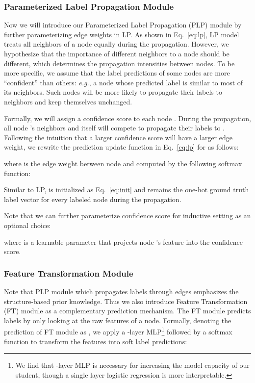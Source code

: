 \documentclass[sigconf]{acmart}
\begin{document}
\subsubsection{Parameterized Label Propagation Module}
Now we will introduce our Parameterized Label Propagation (PLP) module by further parameterizing edge weights in LP. As shown in Eq.~\ref{eq:lp}, LP model treats all neighbors of a node equally during the propagation. However, we hypothesize that the importance of different neighbors to a node should be different, which determines the propagation intensities between nodes. To be more specific, we assume that the label predictions of some nodes are more ``confident'' than others: \textit{e.g.}, a node whose predicted label is similar to most of its neighbors. Such nodes will be more likely to propagate their labels to neighbors and keep themselves unchanged.

Formally, we will assign a confidence score  to each node . During the propagation, all node 's neighbors and  itself will compete to propagate their labels to . Following the intuition that a larger confidence score will have a larger edge weight, we rewrite the prediction update function in Eq.~\ref{eq:lp} for  as follows: 

where  is the edge weight between node  and  computed by the following softmax function:


Similar to LP,  is initialized as Eq.~\ref{eq:init} and  remains the one-hot ground truth label vector for every labeled node  during the propagation.

Note that we can further parameterize confidence score  for inductive setting as an optional choice:

where  is a learnable parameter that projects node 's feature into the confidence score.

\subsubsection{Feature Transformation Module}
Note that PLP module which propagates labels through edges emphasizes the structure-based prior knowledge. Thus we also introduce Feature Transformation (FT) module as a complementary prediction mechanism. The FT module predicts labels by only looking at the raw features of a node. Formally, denoting the prediction of FT module as , we apply a -layer MLP\footnote{We find that -layer MLP is necessary for increasing the model capacity of our student, though a single layer logistic regression is more interpretable.} followed by a softmax function to transform the features into soft label predictions:
\end{document}
